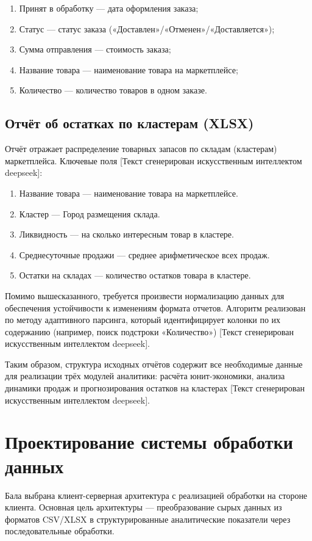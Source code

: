 \begin{enumerate}
\item Принят в обработку — дата оформления заказа;
\item Статус — статус заказа («Доставлен»/«Отменен»/«Доставляется»);
\item Сумма отправления — стоимость заказа;
\item Название товара — наименование товара на маркетплейсе;
\item Количество — количество товаров в одном заказе.
\end{enumerate}

\subsection{Отчёт об остатках по кластерам (XLSX)}

Отчёт отражает распределение товарных запасов по складам (кластерам) маркетплейса. Ключевые поля [Текст сгенерирован искусственным интеллектом deepseek]:

\begin{enumerate}
\item Название товара — наименование товара на маркетплейсе.
\item Кластер — Город размещения склада.
\item Ликвидность — на сколько интересным товар в кластере.
\item Среднесуточные продажи — среднее арифметическое всех продаж.
\item Остатки на складах — количество остатков товара в кластере.
\end{enumerate}

Помимо вышесказанного, требуется произвести нормализацию данных для обеспечения устойчивости к изменениям формата отчетов. Алгоритм реализован по методу адаптивного парсинга, который идентифицирует колонки по их содержанию (например, поиск подстроки «Количество») [Текст сгенерирован искусственным интеллектом deepseek].

Таким образом, структура исходных отчётов содержит все необходимые данные для реализации трёх модулей аналитики: расчёта юнит-экономики, анализа динамики продаж и прогнозирования остатков на кластерах [Текст сгенерирован искусственным интеллектом deepseek].

\section{Проектирование системы обработки данных}
Бала выбрана клиент-серверная архитектура с реализацией обработки на стороне клиента. Основная цель архитектуры — преобразование сырых данных из форматов CSV/XLSX в структурированные аналитические показатели через последовательные обработки.

